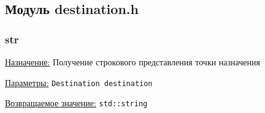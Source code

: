 \subsection{Модуль destination.h}


\subsubsection{str}

\underline{Назначение:} Получение строкового представления точки назначения

\underline{Параметры:} \verb|Destination destination|

\underline{Возвращаемое значение:} \verb|std::string|

